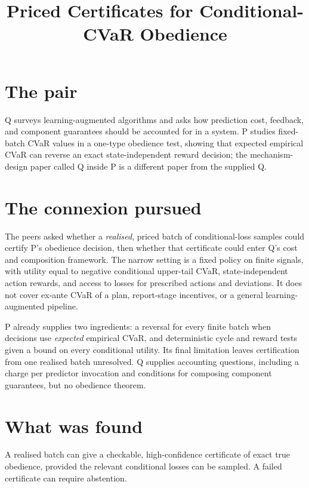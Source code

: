\documentclass{article}
\title{Priced Certificates for Conditional-CVaR Obedience}
\begin{document}
\maketitle

\section{The pair}

Q surveys learning-augmented algorithms and asks how prediction cost, feedback, and component guarantees should be accounted for in a system. P studies fixed-batch CVaR values in a one-type obedience test, showing that expected empirical CVaR can reverse an exact state-independent reward decision; the mechanism-design paper called Q inside P is a different paper from the supplied Q. 

\section{The connexion pursued}

The peers asked whether a \emph{realised}, priced batch of conditional-loss samples could certify P's obedience decision, then whether that certificate could enter Q's cost and composition framework. The narrow setting is a fixed policy on finite signals, with utility equal to negative conditional upper-tail CVaR, state-independent action rewards, and access to losses for prescribed actions and deviations. It does not cover ex-ante CVaR of a plan, report-stage incentives, or a general learning-augmented pipeline. 

P already supplies two ingredients: a reversal for every finite batch when decisions use \emph{expected} empirical CVaR, and deterministic cycle and reward tests given a bound on every conditional utility. Its final limitation leaves certification from one realised batch unresolved. Q supplies accounting questions, including a charge per predictor invocation and conditions for composing component guarantees, but no obedience theorem. 

\section{What was found}

\begin{claim}
A realised batch can give a checkable, high-confidence certificate of exact true obedience, provided the relevant conditional losses can be sampled. A failed certificate can require abstention.
\end{claim}
\end{document}
